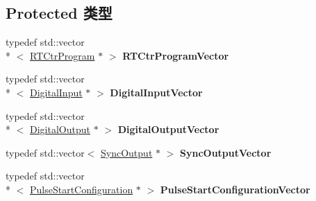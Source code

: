 \subsection*{Protected 类型}
\begin{DoxyCompactItemize}
\item 
\hypertarget{classmv_i_m_p_a_c_t_1_1acquire_1_1_i_o_sub_system_a73496b5081e8232ac655f3ae4f69b303}{typedef std\+::vector\\*
$<$ \hyperlink{classmv_i_m_p_a_c_t_1_1acquire_1_1_r_t_ctr_program}{R\+T\+Ctr\+Program} $\ast$ $>$ {\bfseries R\+T\+Ctr\+Program\+Vector}}\label{classmv_i_m_p_a_c_t_1_1acquire_1_1_i_o_sub_system_a73496b5081e8232ac655f3ae4f69b303}

\item 
\hypertarget{classmv_i_m_p_a_c_t_1_1acquire_1_1_i_o_sub_system_a8d4b2c4fd05eedfc35b9b368510781cc}{typedef std\+::vector\\*
$<$ \hyperlink{classmv_i_m_p_a_c_t_1_1acquire_1_1_digital_input}{Digital\+Input} $\ast$ $>$ {\bfseries Digital\+Input\+Vector}}\label{classmv_i_m_p_a_c_t_1_1acquire_1_1_i_o_sub_system_a8d4b2c4fd05eedfc35b9b368510781cc}

\item 
\hypertarget{classmv_i_m_p_a_c_t_1_1acquire_1_1_i_o_sub_system_a86a90150ba784dbb58fed3f5ed78d929}{typedef std\+::vector\\*
$<$ \hyperlink{classmv_i_m_p_a_c_t_1_1acquire_1_1_digital_output}{Digital\+Output} $\ast$ $>$ {\bfseries Digital\+Output\+Vector}}\label{classmv_i_m_p_a_c_t_1_1acquire_1_1_i_o_sub_system_a86a90150ba784dbb58fed3f5ed78d929}

\item 
\hypertarget{classmv_i_m_p_a_c_t_1_1acquire_1_1_i_o_sub_system_ad955a98b511d6ce0c1f84e7545fd8200}{typedef std\+::vector$<$ \hyperlink{classmv_i_m_p_a_c_t_1_1acquire_1_1_sync_output}{Sync\+Output} $\ast$ $>$ {\bfseries Sync\+Output\+Vector}}\label{classmv_i_m_p_a_c_t_1_1acquire_1_1_i_o_sub_system_ad955a98b511d6ce0c1f84e7545fd8200}

\item 
\hypertarget{classmv_i_m_p_a_c_t_1_1acquire_1_1_i_o_sub_system_a11c50bda535c9e0cd7768760d8ef97ef}{typedef std\+::vector\\*
$<$ \hyperlink{classmv_i_m_p_a_c_t_1_1acquire_1_1_pulse_start_configuration}{Pulse\+Start\+Configuration} $\ast$ $>$ {\bfseries Pulse\+Start\+Configuration\+Vector}}\label{classmv_i_m_p_a_c_t_1_1acquire_1_1_i_o_sub_system_a11c50bda535c9e0cd7768760d8ef97ef}

\end{DoxyCompactItemize}

